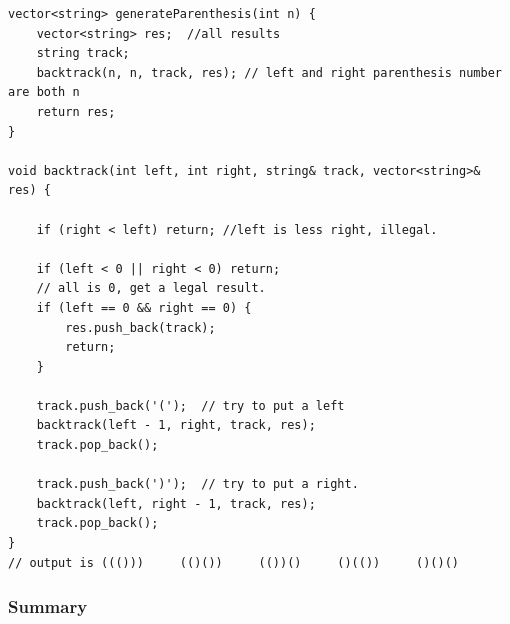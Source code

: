 \documentclass[a4paper,11pt,twoside]{book}
\begin{document}
\begin{lstlisting}
vector<string> generateParenthesis(int n) {
	vector<string> res;  //all results
	string track;
	backtrack(n, n, track, res); // left and right parenthesis number are both n
	return res;
}

void backtrack(int left, int right, string& track, vector<string>& res) {
	
	if (right < left) return; //left is less right, illegal.
	
	if (left < 0 || right < 0) return;
	// all is 0, get a legal result.
	if (left == 0 && right == 0) {
		res.push_back(track);
		return;
	}
	
	track.push_back('(');  // try to put a left 
	backtrack(left - 1, right, track, res);
	track.pop_back(); 
	
	track.push_back(')');  // try to put a right.
	backtrack(left, right - 1, track, res);
	track.pop_back(); 
}
// output is ((()))     (()())     (())()     ()(())     ()()()
\end{lstlisting}

\subsubsection{Summary}
	
\end{document}
